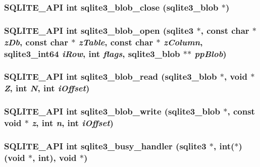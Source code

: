 \subsubsection{\setlength{\rightskip}{0pt plus 5cm}SQLITE\_\-API int sqlite3\_\-blob\_\-close (\bf{sqlite3\_\-blob} $\ast$)}\label{sqlite3_8h_97d37c38d3554508551155d3faae3874}


\subsubsection{\setlength{\rightskip}{0pt plus 5cm}SQLITE\_\-API int sqlite3\_\-blob\_\-open (\bf{sqlite3} $\ast$, const char $\ast$ {\em z\-Db}, const char $\ast$ {\em z\-Table}, const char $\ast$ {\em z\-Column}, \bf{sqlite3\_\-int64} {\em i\-Row}, int {\em flags}, \bf{sqlite3\_\-blob} $\ast$$\ast$ {\em pp\-Blob})}\label{sqlite3_8h_facbe3cf34b3a121f2d701237405a0c0}


\subsubsection{\setlength{\rightskip}{0pt plus 5cm}SQLITE\_\-API int sqlite3\_\-blob\_\-read (\bf{sqlite3\_\-blob} $\ast$, void $\ast$ {\em Z}, int {\em N}, int {\em i\-Offset})}\label{sqlite3_8h_13798194938ed4c3776bee2ba325fa93}


\subsubsection{\setlength{\rightskip}{0pt plus 5cm}SQLITE\_\-API int sqlite3\_\-blob\_\-write (\bf{sqlite3\_\-blob} $\ast$, const void $\ast$ {\em z}, int {\em n}, int {\em i\-Offset})}\label{sqlite3_8h_427fc558139a041b077a52449652fe78}


\subsubsection{\setlength{\rightskip}{0pt plus 5cm}SQLITE\_\-API int sqlite3\_\-busy\_\-handler (\bf{sqlite3} $\ast$, int($\ast$)(void $\ast$, int), void $\ast$)}\label{sqlite3_8h_93a0e747e6f831295658e0f57a4160c6}


